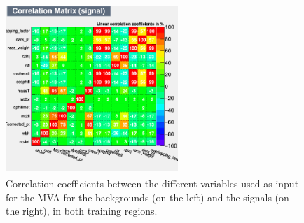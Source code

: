 \documentclass[a4paper, 10pt, openright]{report}
\begin{document}
\begin{figure}[htbp]
{\begin{minipage}[b]{.49\textwidth}
\end{minipage}\hfill
\begin{minipage}[b]{.49\textwidth}
\includegraphics[width=6.5cm, height=6.5cm]{figs/corr_signal_TTbar.png}
\end{minipage} \hfill
}
\caption{Correlation coefficients between the different variables used as input for the \ac{MVA} for the backgrounds (on the left) and the signals (on the right), in both training regions.}
\label{fig:correlationVar}
\end{figure}
\end{document}
